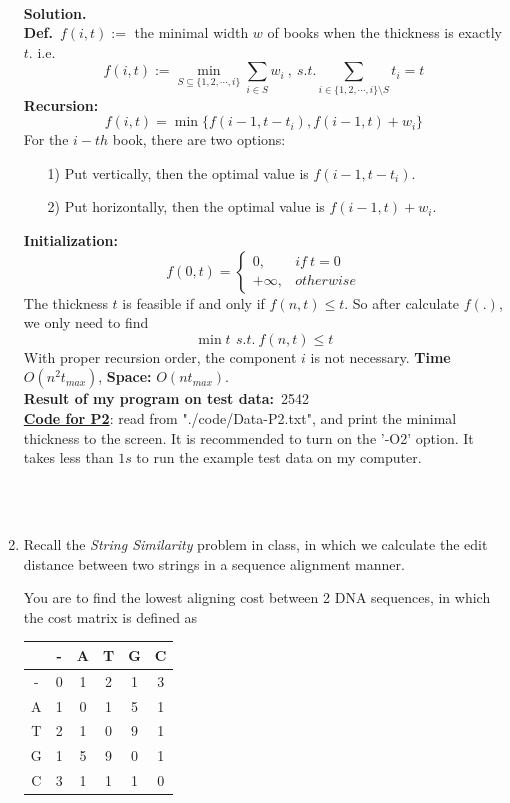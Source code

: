 \documentclass{article}
\newtheorem*{solution}{Solution}
\renewenvironment{solution}[1][Solution]{~\\ \textbf{#1.}}{~\\}
\newcommand{\myblock}[2]{\textbf{#1}\ {#2}}
\begin{document}
\begin{enumerate}
    \begin{solution}
    ~\\
    \myblock{Def.}{$f(i, t) :=$ the minimal width $w$ of books when the thickness is exactly $t$.} i.e. $$f(i,t):=\min_{S\subseteq\{1,2,\cdots,i\}} \sum_{i\in S} w_i\ ,\ s.t. \sum_{i\in\{1,2,\cdots,i\}\setminus S} t_i = t$$
    \myblock{Recursion:}{$$f(i, t) = \min\{f(i-1, t-t_i), f(i-1, t)+w_i\}$$}
    For the $i-th$ book, there are two options:\begin{itemize} \item [1)] Put vertically, then the optimal value is $f(i-1, t-t_i)$. \item [2)] Put horizontally, then the optimal value is $f(i-1,t)+w_i$.\end{itemize} 
    \myblock{Initialization:}{$$f(0,t)=\left\{\begin{array}{ll}0, &if\ t=0\\+\infty, &otherwise\end{array}\right.$$}
    The thickness $t$ is feasible if and only if $f(n, t) \leq t$. So after calculate $f(.)$, we only need to find $$\min t\,\ s.t.\ f(n,t)\leq t$$
    With proper recursion order, the component $i$ is not necessary. \textbf{Time} $O(n^2t_{max})$, \textbf{Space:} $O(nt_{max})$.\\
    \myblock{Result of my program on test data:}{2542}\\
    \href{run:./code/main2.cpp}{\textbf{Code for P2}}: read from "./code/Data-P2.txt", and print the minimal thickness to the screen. It is recommended to turn on the '-O2' option. It takes less than $1s$ to run the example test data on my computer.
    \end{solution}

~\\
~\\

    \item
    Recall the \emph{String Similarity} problem in class, in which we calculate the edit distance between two strings in a sequence alignment manner.

    You are to find the lowest aligning cost between 2 DNA sequences, in which the cost matrix is defined as

    \begin{center}
        \begin{tabular}{|c||c|c|c|c|c|}
        \hline
          & - & A & T & G & C \\
        \hline
        - & 0 & 1 & 2 & 1 & 3 \\
        A & 1 & 0 & 1 & 5 & 1 \\
        T & 2 & 1 & 0 & 9 & 1 \\
        G & 1 & 5 & 9 & 0 & 1 \\
        C & 3 & 1 & 1 & 1 & 0 \\
        \hline
        \end{tabular}
    \end{center}


\end{enumerate}
\end{document}
